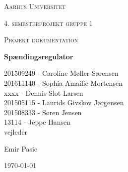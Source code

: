 \thispagestyle{empty}
{\centering
	{\scshape\LARGE Aarhus Universitet \par}
	\vspace{1cm}
	{\scshape\Large 4. semesterprojekt gruppe 1\par}
	{\scshape\Large Projekt dokumentation\par}
	\vspace{1.5cm}
	{\huge\bfseries Spændingsregulator\par}
	\vspace{2cm}
	{\Large
		201509249 - Caroline Møller Sørensen\\
		201611140 - Sophia Amailie Mortensen\\
		 xxxx	- Dennis Slot Larsen \\
		201505115 - Laurids Givskov Jørgensen\\
		201508333 - Søren Jensen\\
		13114 - Jeppe Hansen\\  }
	\vfill
	vejleder\par
	Emir Pasic
	
	\vfill
	
	{\large \today\par}
	\par}



